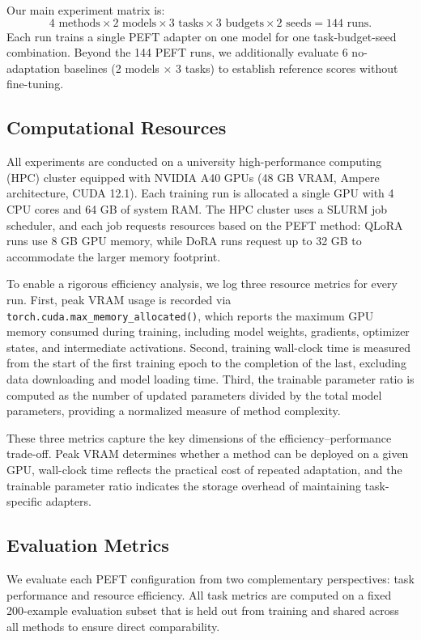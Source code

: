 \documentclass{article}
\begin{document}
Our main experiment matrix is:
\[
4 \text{ methods} \times 2 \text{ models} \times 3 \text{ tasks} \times 3 \text{ budgets} \times 2 \text{ seeds} = 144 \text{ runs}.
\]
Each run trains a single PEFT adapter on one model for one task-budget-seed combination. Beyond the 144 PEFT runs, we additionally evaluate 6 no-adaptation baselines (2 models $\times$ 3 tasks) to establish reference scores without fine-tuning.

\subsection{Computational Resources}

All experiments are conducted on a university high-performance computing (HPC) cluster equipped with NVIDIA A40 GPUs (48 GB VRAM, Ampere architecture, CUDA 12.1). Each training run is allocated a single GPU with 4 CPU cores and 64 GB of system RAM. The HPC cluster uses a SLURM job scheduler, and each job requests resources based on the PEFT method: QLoRA runs use 8 GB GPU memory, while DoRA runs request up to 32 GB to accommodate the larger memory footprint.

To enable a rigorous efficiency analysis, we log three resource metrics for every run. First, peak VRAM usage is recorded via \texttt{torch.cuda.max\_memory\_allocated()}, which reports the maximum GPU memory consumed during training, including model weights, gradients, optimizer states, and intermediate activations. Second, training wall-clock time is measured from the start of the first training epoch to the completion of the last, excluding data downloading and model loading time. Third, the trainable parameter ratio is computed as the number of updated parameters divided by the total model parameters, providing a normalized measure of method complexity.

These three metrics capture the key dimensions of the efficiency--performance trade-off. Peak VRAM determines whether a method can be deployed on a given GPU, wall-clock time reflects the practical cost of repeated adaptation, and the trainable parameter ratio indicates the storage overhead of maintaining task-specific adapters.

\subsection{Evaluation Metrics}

We evaluate each PEFT configuration from two complementary perspectives: task performance and resource efficiency. All task metrics are computed on a fixed 200-example evaluation subset that is held out from training and shared across all methods to ensure direct comparability.
\end{document}
